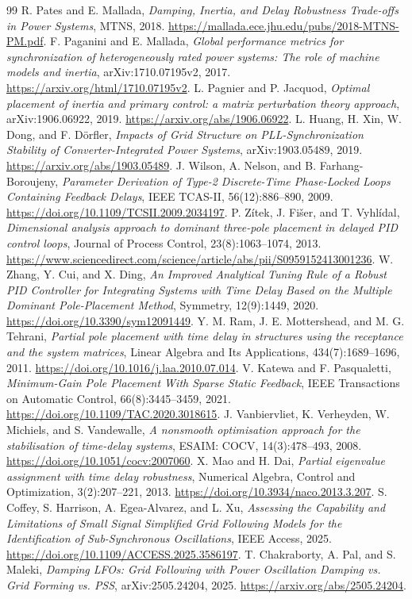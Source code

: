 \documentclass[11pt]{article}
\begin{document}
\begin{thebibliography}{99}
 R. Pates and E. Mallada,
\emph{Damping, Inertia, and Delay Robustness Trade-offs in Power Systems},
MTNS, 2018.
\url{https://mallada.ece.jhu.edu/pubs/2018-MTNS-PM.pdf}.
 F. Paganini and E. Mallada,
\emph{Global performance metrics for synchronization of heterogeneously
rated power systems: The role of machine models and inertia},
arXiv:1710.07195v2, 2017.
\url{https://arxiv.org/html/1710.07195v2}.
 L. Pagnier and P. Jacquod,
\emph{Optimal placement of inertia and primary control: a matrix
perturbation theory approach}, arXiv:1906.06922, 2019.
\url{https://arxiv.org/abs/1906.06922}.
 L. Huang, H. Xin, W. Dong, and F. D\"orfler,
\emph{Impacts of Grid Structure on PLL-Synchronization Stability of
Converter-Integrated Power Systems}, arXiv:1903.05489, 2019.
\url{https://arxiv.org/abs/1903.05489}.
 J. Wilson, A. Nelson, and B. Farhang-Boroujeny,
\emph{Parameter Derivation of Type-2 Discrete-Time Phase-Locked Loops
Containing Feedback Delays}, IEEE TCAS-II, 56(12):886--890, 2009.
\url{https://doi.org/10.1109/TCSII.2009.2034197}.
 P. Z\'itek, J. Fi\v{s}er, and T. Vyhl\'idal,
\emph{Dimensional analysis approach to dominant three-pole placement
in delayed PID control loops}, Journal of Process Control,
23(8):1063--1074, 2013.
\url{https://www.sciencedirect.com/science/article/abs/pii/S0959152413001236}.
 W. Zhang, Y. Cui, and X. Ding,
\emph{An Improved Analytical Tuning Rule of a Robust PID Controller
for Integrating Systems with Time Delay Based on the Multiple
Dominant Pole-Placement Method}, Symmetry, 12(9):1449, 2020.
\url{https://doi.org/10.3390/sym12091449}.
 Y. M. Ram, J. E. Mottershead, and M. G. Tehrani,
\emph{Partial pole placement with time delay in structures using the
receptance and the system matrices}, Linear Algebra and Its Applications,
434(7):1689--1696, 2011.
\url{https://doi.org/10.1016/j.laa.2010.07.014}.
 V. Katewa and F. Pasqualetti,
\emph{Minimum-Gain Pole Placement With Sparse Static Feedback},
IEEE Transactions on Automatic Control, 66(8):3445--3459, 2021.
\url{https://doi.org/10.1109/TAC.2020.3018615}.
 J. Vanbiervliet, K. Verheyden, W. Michiels,
and S. Vandewalle, \emph{A nonsmooth optimisation approach for the
stabilisation of time-delay systems}, ESAIM: COCV, 14(3):478--493, 2008.
\url{https://doi.org/10.1051/cocv:2007060}.
 X. Mao and H. Dai,
\emph{Partial eigenvalue assignment with time delay robustness},
Numerical Algebra, Control and Optimization, 3(2):207--221, 2013.
\url{https://doi.org/10.3934/naco.2013.3.207}.
 S. Coffey, S. Harrison, A. Egea-Alvarez, and L. Xu,
\emph{Assessing the Capability and Limitations of Small Signal
Simplified Grid Following Models for the Identification of
Sub-Synchronous Oscillations}, IEEE Access, 2025.
\url{https://doi.org/10.1109/ACCESS.2025.3586197}.
 T. Chakraborty, A. Pal, and S. Maleki,
\emph{Damping LFOs: Grid Following with Power Oscillation Damping
vs. Grid Forming vs. PSS}, arXiv:2505.24204, 2025.
\url{https://arxiv.org/abs/2505.24204}.


\end{thebibliography}
\end{document}
